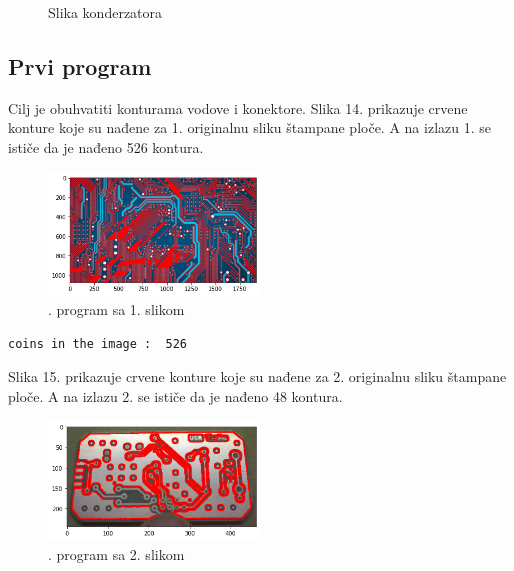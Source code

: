 \documentclass[fontsize=12bp, paper=a4]{scrarticle}
\begin{document}
\begin{figure}[hbp!]
\begin{minipage}[b]{0.2\textwidth}
        \caption{\centering Slika konderzatora}
    \end{minipage}
\end{figure}  
\newpage
\subsection*{Prvi program}

Cilj je obuhvatiti konturama vodove i konektore. Slika 14. prikazuje crvene konture koje su nađene za 1. originalnu sliku štampane ploče. A na izlazu 1. se ističe da je nađeno 526 kontura. 
\begin{figure}[h!]
    \centering
    \includegraphics[width=0.5\textwidth]{11.png}
    \caption{. program sa 1. slikom}
\end{figure} 

\begin{lstlisting}[caption=1. program sa 1. slikom]
    coins in the image :  526
\end{lstlisting}

Slika 15. prikazuje crvene konture koje su nađene za 2. originalnu sliku štampane ploče. A na izlazu 2. se ističe da je nađeno 48 kontura. 

\begin{figure}[h!]
    \centering
    \includegraphics[width=0.5\textwidth]{12.png}
    \caption{. program sa 2. slikom}
\end{figure} 
\end{document}
